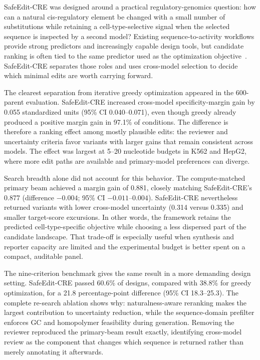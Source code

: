 SafeEdit-CRE was designed around a practical regulatory-genomics question: how can a
natural cis-regulatory element be changed with a small number of substitutions while
retaining a cell-type-selective signal when the selected sequence is inspected by a
second model? Existing sequence-to-activity workflows provide strong predictors and
increasingly capable design tools, but candidate ranking is often tied to the same
predictor used as the optimization objective~\citep{Whalen2022,deBoer2024,Rafi2025}.
SafeEdit-CRE separates those roles and uses cross-model selection to decide which
minimal edits are worth carrying forward.

The clearest separation from iterative greedy optimization appeared in the 600-parent
evaluation. SafeEdit-CRE increased cross-model specificity-margin gain by 0.055
standardized units (95\% CI 0.040--0.071), even though greedy already produced a
positive margin gain in 97.1\% of conditions. The difference is therefore a ranking
effect among mostly plausible edits: the reviewer and uncertainty criteria favor
variants with larger gains that remain consistent across models. The effect was
largest at 5--20 nucleotide budgets in K562 and HepG2, where more edit paths are
available and primary-model preferences can diverge.

Search breadth alone did not account for this behavior. The compute-matched primary
beam achieved a margin gain of 0.881, closely matching SafeEdit-CRE's
0.877 (difference $-0.004$; 95\% CI $-0.011$--$0.004$). SafeEdit-CRE nevertheless
returned variants with lower cross-model uncertainty (0.314 versus 0.335) and smaller
target-score excursions. In other words, the framework retains the predicted
cell-type-specific objective while choosing a less dispersed part of the candidate
landscape. That trade-off is especially useful when synthesis and reporter capacity
are limited and the experimental budget is better spent on a compact, auditable panel.

The nine-criterion benchmark gives the same result in a more demanding design setting.
SafeEdit-CRE passed 60.6\% of designs, compared with 38.8\% for greedy optimization,
for a 21.8 percentage-point difference (95\% CI 18.3--25.3). The complete re-search
ablation shows why: naturalness-aware reranking makes the largest contribution to
uncertainty reduction, while the sequence-domain prefilter enforces GC and
homopolymer feasibility during generation. Removing the reviewer reproduced the
primary-beam result exactly, identifying cross-model review as the component that
changes which sequence is returned rather than merely annotating it afterwards.

